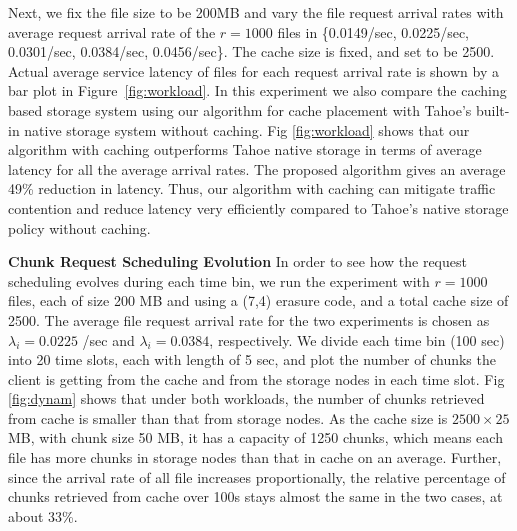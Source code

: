 Next, we fix the file size to be 200MB and vary the file request arrival rates with average request arrival rate of the $r=1000$ files in \{0.0149/sec, 0.0225/sec, 0.0301/sec, 0.0384/sec, 0.0456/sec\}. The  cache size is fixed, and set to be 2500. Actual average service latency of files for each request arrival rate is shown by a bar plot in Figure~\ref{fig:workload}. In this experiment we also compare the caching based storage system using our algorithm for cache placement with Tahoe’s built-in native storage system without caching. Fig \ref{fig:workload} shows that our algorithm with caching outperforms Tahoe native storage in terms of average latency for all the average arrival rates. The proposed algorithm gives an average  49\% reduction in latency.  Thus, our algorithm with caching can mitigate traffic contention and reduce latency very efficiently compared to Tahoe’s native storage policy without caching.

{\bf Chunk Request Scheduling Evolution} In order to see how the request scheduling evolves during each time bin, we run the experiment with $r=1000$ files, each of size 200 MB and using a (7,4) erasure code, and a total cache size of 2500. The average file request arrival rate for the two experiments  is chosen as $\lambda_i=0.0225$ /sec and $\lambda_i=0.0384$, respectively. We divide each time bin (100 sec) into 20 time slots, each with length of 5 sec, and plot the number of chunks the client is getting from the cache and from the storage nodes in each time slot. Fig \ref{fig:dynam} shows that under both workloads, the number of chunks  retrieved from cache is smaller than that from storage nodes. As the cache size is $2500\times 25$ MB, with chunk size 50 MB, it has a capacity of 1250 chunks, which means each file has more chunks in storage nodes than that in cache on an average. Further, since the arrival rate of all file increases proportionally, the relative percentage of chunks retrieved from cache over 100s stays almost the same in the two cases, at about 33\%.


